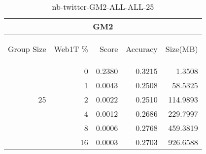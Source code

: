 \begin{center}
\begin{table}[htbp]
\begin{tabular}{ | r | r | r | r | r |}
\hline
\multicolumn{5}{|c|}{GM2}\\
\hline
\begin{sideways}Group Size\end{sideways} & \begin{sideways}Web1T \%\end{sideways} & \begin{sideways}Score\end{sideways} & \begin{sideways}Accuracy\end{sideways} & \begin{sideways}Size(MB)\end{sideways}\\
\hline
\multirow{5}{*}{25}
 & 0 & 0.2380 & 0.3215 & 1.3508\\ \cline{2-5}
 & 1 & 0.0043 & 0.2508 & 58.5325\\ \cline{2-5}
 & 2 & 0.0022 & 0.2510 & 114.9893\\ \cline{2-5}
 & 4 & 0.0012 & 0.2686 & 229.7997\\ \cline{2-5}
 & 8 & 0.0006 & 0.2768 & 459.3819\\ \cline{2-5}
 & 16 & 0.0003 & 0.2703 & 926.6588\\ \cline{2-5}
\hline
\end{tabular}
\caption{nb-twitter-GM2-ALL-ALL-25}
\label{table:nb-twitter-GM2-ALL-ALL-25}
\end{table}
\end{center}

